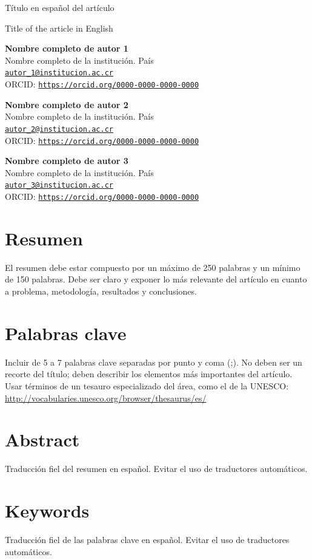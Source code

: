 \documentclass[12pt,letterpaper]{article}
\newcommand{\TEMtitleES}{Título en español del artículo}
\newcommand{\TEMtitleEN}{Title of the article in English}
\newcommand{\TEMtitle}[1]{%
  \begin{center}
    {\fontsize{28}{32}\selectfont #1\par}
  \end{center}
}
\newcommand{\TEMauthor}[4]{%
  \noindent\textbf{#1}\\
  #2\\
  \href{mailto:#3}{\nolinkurl{#3}}\\
  ORCID: \href{#4}{\nolinkurl{#4}}\par
  \vspace{0.25\baselineskip}
}
\begin{document}
\TEMtitle{\TEMtitleES}

\TEMtitle{\foreignlanguage{english}{\TEMtitleEN}}

\vspace{0.5\baselineskip}

\TEMauthor{Nombre completo de autor 1}{Nombre completo de la institución. País}{autor_1@institucion.ac.cr}{https://orcid.org/0000-0000-0000-0000}
\TEMauthor{Nombre completo de autor 2}{Nombre completo de la institución. País}{autor_2@institucion.ac.cr}{https://orcid.org/0000-0000-0000-0000}
\TEMauthor{Nombre completo de autor 3}{Nombre completo de la institución. País}{autor_3@institucion.ac.cr}{https://orcid.org/0000-0000-0000-0000}

\section{Resumen}
El resumen debe estar compuesto por un máximo de 250 palabras y un mínimo de 150 palabras. Debe ser claro y exponer lo más relevante del artículo en cuanto a problema, metodología, resultados y conclusiones.

\section{Palabras clave}
Incluir de 5 a 7 palabras clave separadas por punto y coma (;). No deben ser un recorte del título; deben describir los elementos más importantes del artículo. Usar términos de un tesauro especializado del área, como el de la UNESCO: \url{http://vocabularies.unesco.org/browser/thesaurus/es/}

\begin{otherlanguage}{english}
\section{Abstract}
\foreignlanguage{spanish}{Traducción fiel del resumen en español. Evitar el uso de traductores automáticos.}

\section{Keywords}
\foreignlanguage{spanish}{Traducción fiel de las palabras clave en español. Evitar el uso de traductores automáticos.}
\end{otherlanguage}
\end{document}
